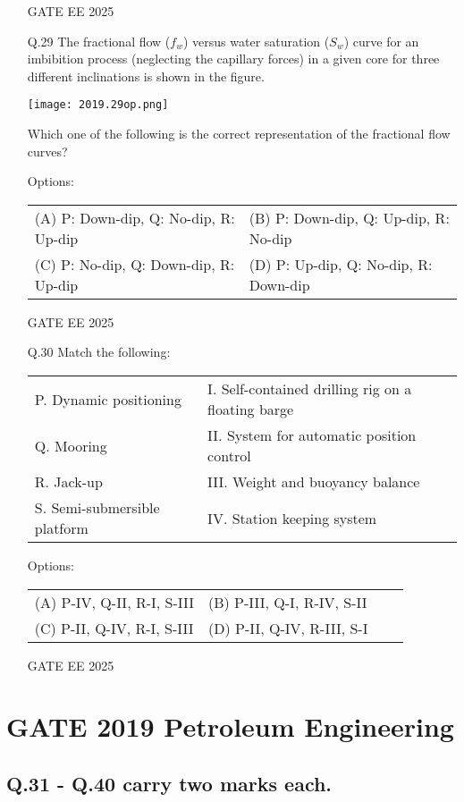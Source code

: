 \documentclass{article}
\begin{document}
\begin{enumerate}[resume*=q]
GATE EE 2025
 \vspace{0.5cm} 
\item[Q.29] The fractional flow ($f_w$) versus water saturation ($S_w$) curve for an imbibition process (neglecting the capillary forces) in a given core for three different inclinations is shown in the figure.

\begin{center}
\texttt{[image: 2019.29op.png]}
\end{center}

Which one of the following is the correct representation of the fractional flow curves?

Options:
\begin{tabular}{ll}
(A) P: Down-dip, Q: No-dip, R: Up-dip & (B) P: Down-dip, Q: Up-dip, R: No-dip \\
(C) P: No-dip, Q: Down-dip, R: Up-dip & (D) P: Up-dip, Q: No-dip, R: Down-dip
\end{tabular}

GATE EE 2025
 \vspace{0.5cm} 
\item[Q.30] Match the following:

\begin{tabular}{ll}
P. Dynamic positioning & I. Self-contained drilling rig on a floating barge \\
Q. Mooring & II. System for automatic position control \\
R. Jack-up & III. Weight and buoyancy balance \\
S. Semi-submersible platform & IV. Station keeping system \\
\end{tabular}

Options:
\begin{tabular}{llll}
(A) P-IV, Q-II, R-I, S-III & (B) P-III, Q-I, R-IV, S-II \\
(C) P-II, Q-IV, R-I, S-III & (D) P-II, Q-IV, R-III, S-I
\end{tabular}

GATE EE 2025
 \vspace{0.5cm} 
\end{enumerate}


\section*{GATE 2019 Petroleum Engineering}

\subsection*{Q.31 - Q.40 carry two marks each.}
\end{document}
